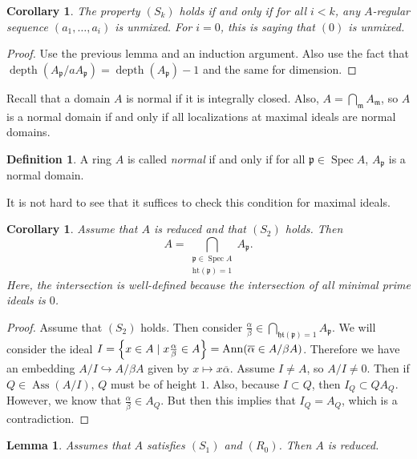 \documentclass[leqno, openany]{memoir}
\newtheorem{cor}[thm]{Corollary}
\newtheorem{lem}[thm]{Lemma}
\theoremstyle{definition}
\newtheorem{defn}[thm]{Definition}
\theoremstyle{remark}
\theoremstyle{plain}
\theoremstyle{definition}
\theoremstyle{remark}
\newcommand{\mf}[1]{\mathfrak{#1}}
\newcommand{\mr}[1]{\mathrm{#1}}
\newcommand{\ol}[1]{\overline{#1}}
\DeclareMathOperator{\Spec}{Spec}
\DeclareMathOperator{\Ann}{Ann}
\DeclareMathOperator{\Ass}{Ass}
\DeclareMathOperator{\dpth}{depth}
\begin{document}
\begin{cor}
    The property $(S_k)$ holds if and only if for all $i < k$, any $A$-regular sequence $(a_1, \ldots, a_i)$ is unmixed. For $i = 0$, this is saying that $(0)$ is unmixed.
\end{cor}

\begin{proof}
    Use the previous lemma and an induction argument. Also use the fact that $\dpth(A_{\mf{p}} / a A_{\mf{p}}) = \dpth(A_{\mf{p}}) - 1$ and the same for dimension.
\end{proof}

Recall that a domain $A$ is normal if it is integrally closed. Also, $A = \bigcap_{\mf{m}} A_{\mf{m}}$, so $A$ is a normal domain if and only if all localizations at maximal ideals are normal domains.

\begin{defn}
    A ring $A$ is called \textit{normal} if and only if for all $\mf{p} \in \Spec A$, $A_{\mf{p}}$ is a normal domain. 
\end{defn}

It is not hard to see that it suffices to check this condition for maximal ideals. 

\begin{cor}
    Assume that $A$ is reduced and that $(S_2)$ holds. Then
    \[ A = \bigcap_{\substack{\mf{p} \in \Spec A \\ \mr{ht}(\mf{p}) = 1}} A_{\mf{p}}. \]
    Here, the intersection is well-defined because the intersection of all minimal prime ideals is $\qty{0}$.
\end{cor}

\begin{proof}
    Assume that $(S_2)$ holds. Then consider $\frac{\alpha}{\beta} \in \bigcap_{\mf{ht}(\mf{p}) = 1} A_{\mf{p}}$. We will consider the ideal $I = \qty{x \in A \mid x \frac{\alpha}{\beta} \in A} = \Ann (\ol{\alpha} \in A/\beta A)$. Therefore we have an embedding $A/I \hookrightarrow A/\beta A$ given by $x \mapsto x \ol{\alpha}$. Assume $I \neq A$, so $A/I \neq 0$. Then if $Q \in \Ass(A/I)$, $Q$ must be of height $1$. Also, because $I \subset Q$, then $I_Q \subset Q A_Q$. However, we know that $\frac{\alpha}{\beta} \in A_Q$. But then this implies that $I_Q = A_Q$, which is a contradiction.
\end{proof}

\begin{lem}
    Assumes that $A$ satisfies $(S_1)$ and $(R_0)$. Then $A$ is reduced.
\end{lem}
\end{document}
